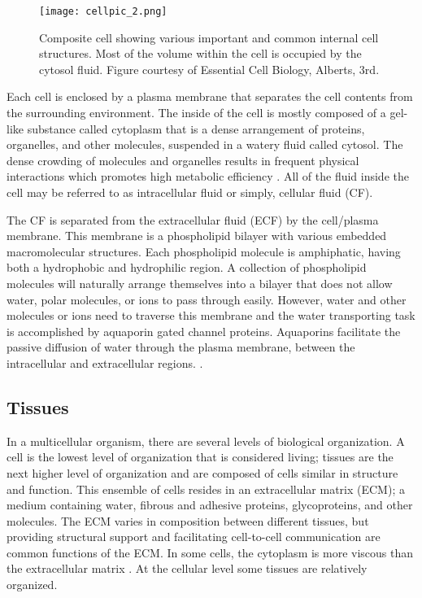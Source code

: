 \begin{figure}[h]
	\centering
	\texttt{[image: cellpic\_2.png]}
	\caption{Composite cell showing various important and common internal cell structures. Most of the volume within the cell is occupied by the cytosol fluid. Figure courtesy of Essential Cell Biology, Alberts, 3rd.}
	\label{fig:cellpic_2.png}
\end{figure}

Each cell is enclosed by a plasma membrane that separates the cell contents from the surrounding environment. The inside of the cell is mostly composed of a gel-like substance called cytoplasm that is a dense arrangement of proteins, organelles, and other molecules, suspended in a watery fluid called cytosol. The dense crowding of molecules and organelles results in frequent physical interactions which promotes high metabolic efficiency \citep{ap}. All of the fluid inside the cell may be referred to as intracellular fluid or simply, cellular fluid (CF).

The CF is separated from the extracellular fluid (ECF) by the cell/plasma membrane. This membrane is a phospholipid bilayer with various embedded macromolecular structures. Each phospholipid molecule is amphiphatic, having both a hydrophobic and hydrophilic region. A collection of phospholipid molecules will naturally arrange themselves into a bilayer that does not allow water, polar molecules, or ions to pass through easily. However, water and other molecules or ions need to traverse this membrane and the water transporting task is accomplished by aquaporin gated channel proteins. Aquaporins facilitate the passive diffusion of water through the plasma membrane, between the intracellular and extracellular regions. \citep{ap}.



\subsection{Tissues}
In a multicellular organism, there are several levels of biological organization. A cell is the lowest level of organization that is considered living; tissues are the next higher level of organization and are composed of cells similar in structure and function. This ensemble of cells resides in an extracellular matrix (ECM); a medium containing water, fibrous and adhesive proteins, glycoproteins, and other molecules. The ECM varies in composition between different tissues, but providing structural support and facilitating cell-to-cell communication are common functions of the ECM. In some cells, the cytoplasm is more viscous than the extracellular matrix \citep{cr-biology}. At the cellular level some tissues are relatively organized.

